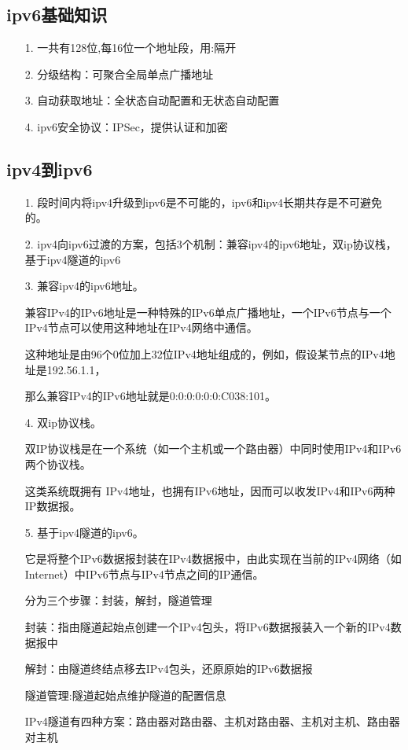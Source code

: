 \documentclass[a4paper,left=1.5cm,right=1.5cm,11pt]{article}
\begin{document}
\tableofcontents

\clearpage

\subsection{ipv6基础知识}
    \begin{itemize}
        \item[1.]一共有128位,每16位一个地址段，用:隔开
        \item[2.]分级结构：可聚合全局单点广播地址
        \item[3.]自动获取地址：全状态自动配置和无状态自动配置
        \item[4.]ipv6安全协议：IPSec，提供认证和加密
    \end{itemize}
\subsection{ipv4到ipv6}
    \begin{itemize}
        \item[1.]段时间内将ipv4升级到ipv6是不可能的，ipv6和ipv4长期共存是不可避免的。
        \item[2.]ipv4向ipv6过渡的方案，包括3个机制：兼容ipv4的ipv6地址，双ip协议栈，基于ipv4隧道的ipv6
		\item[3.]兼容ipv4的ipv6地址。\par
			兼容IPv4的IPv6地址是一种特殊的IPv6单点广播地址，一个IPv6节点与一个IPv4节点可以使用这种地址在IPv4网络中通信。\par
			这种地址是由96个0位加上32位IPv4地址组成的，例如，假设某节点的IPv4地址是192.56.1.1，\par
			那么兼容IPv4的IPv6地址就是0:0:0:0:0:0:C038:101。
		\item[4.]双ip协议栈。 \par
			双IP协议栈是在一个系统（如一个主机或一个路由器）中同时使用IPv4和IPv6两个协议栈。\par
			这类系统既拥有 IPv4地址，也拥有IPv6地址，因而可以收发IPv4和IPv6两种IP数据报。
		\item[5.]基于ipv4隧道的ipv6。\par
			它是将整个IPv6数据报封装在IPv4数据报中，由此实现在当前的IPv4网络（如Internet）中IPv6节点与IPv4节点之间的IP通信。\par
			分为三个步骤：封装，解封，隧道管理 \par
			封装：指由隧道起始点创建一个IPv4包头，将IPv6数据报装入一个新的IPv4数据报中\par
			解封：由隧道终结点移去IPv4包头，还原原始的IPv6数据报\par
			隧道管理:隧道起始点维护隧道的配置信息\par
			IPv4隧道有四种方案：路由器对路由器、主机对路由器、主机对主机、路由器对主机
    \end{itemize}
\end{document}
